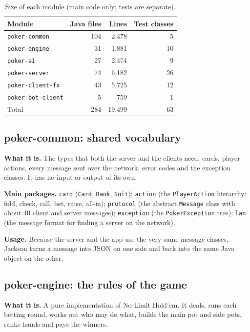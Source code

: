 \documentclass[12pt,a4paper]{article}
\newcommand{\cls}[1]{\texttt{#1}}
\begin{document}
\begin{table}[H]
\centering\small
\caption{Size of each module (main code only; tests are separate).}
\begin{tabular}{@{}lrrr@{}}
\toprule
Module & Java files & Lines & Test classes \\
\midrule
\cls{poker-common}     & 104 & 2,478 & 5 \\
\cls{poker-engine}     &  31 & 1,881 & 10 \\
\cls{poker-ai}         &  27 & 2,474 & 9 \\
\cls{poker-server}     &  74 & 6,182 & 26 \\
\cls{poker-client-fx}  &  43 & 5,725 & 12 \\
\cls{poker-bot-client} &   5 &   759 & 1 \\
\midrule
Total                  & 284 & 19,499 & 63 \\
\bottomrule
\end{tabular}
\end{table}

\subsection{poker-common: shared vocabulary}
\textbf{What it is.} The types that both the server and the clients need: cards, player
actions, every message sent over the network, error codes and the exception classes. It has no
input or output of its own.

\textbf{Main packages.} \cls{card} (\cls{Card}, \cls{Rank}, \cls{Suit}); \cls{action}
(the \cls{PlayerAction} hierarchy: fold, check, call, bet, raise, all-in); \cls{protocol}
(the abstract \cls{Message} class with about 40 client and server messages); \cls{exception}
(the \cls{PokerException} tree); \cls{lan} (the message format for finding a server on the
network).

\textbf{Usage.} Because the server and the app use the very same message classes, Jackson turns
a message into JSON on one side and back into the same Java object on the other.

\subsection{poker-engine: the rules of the game}
\textbf{What it is.} A pure implementation of No-Limit Hold'em. It deals, runs each betting
round, works out who may do what, builds the main pot and side pots, ranks hands and pays the
winners.
\end{document}
